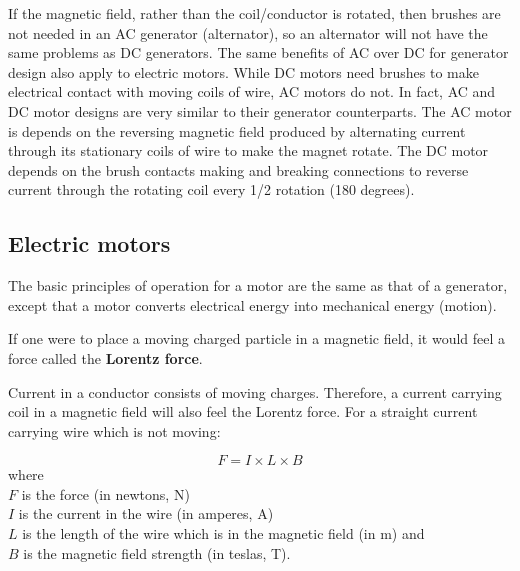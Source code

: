 If the magnetic field, rather than the coil/conductor is rotated, then brushes are not needed in an AC generator (alternator), so an alternator will not have the same problems as DC generators. 
The same benefits of AC over DC for generator design also apply to electric motors.
While DC motors need brushes to make electrical contact with moving coils of wire, AC motors do not. In fact, AC and DC motor designs are very similar to their generator counterparts. 
The AC motor is depends on the reversing magnetic field produced by alternating current through its stationary coils of wire to make the magnet rotate. The DC motor depends on the brush contacts making and breaking
connections to reverse current through the rotating coil every 1/2 rotation (180 degrees).


\subsection{Electric motors}
The basic principles of operation for a motor are the same as that of a generator, except that a motor converts electrical energy into mechanical energy (motion).


If one were to place a moving charged particle in a magnetic field, it would feel a force called the \textbf{Lorentz force}. 


Current in a conductor consists of moving charges. Therefore, a current carrying coil in a magnetic field will also feel the Lorentz force. For a straight current carrying wire which is not moving:

\begin{equation*}
F = I \times L \times B
\end{equation*}
where \\
$F$ is the force (in newtons, N) \\
$I$ is the current in the wire (in amperes, A) \\
$L$ is the length of the wire which is in the magnetic field (in m) and \\
$B$ is the magnetic field strength (in teslas, T). \\

